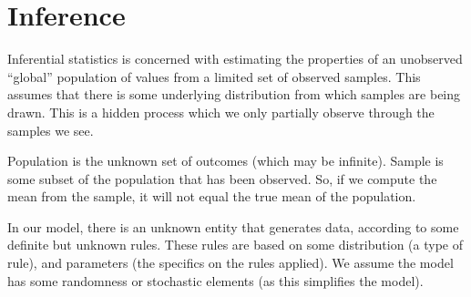 \documentclass[a4paper, openany]{memoir}
\begin{document}
\newpage

\section{Inference}
Inferential statistics is concerned with estimating the properties of an unobserved ``global'' population of values from a limited set of observed samples. This assumes that there is some underlying distribution from which samples are being drawn. This is a hidden process which we only partially observe through the samples we see.

Population is the unknown set of outcomes (which may be infinite). Sample is some subset of the population that has been observed. So, if we compute the mean from the sample, it will not equal the true mean of the population.

In our model, there is an unknown entity that generates data, according to some definite but unknown rules. These rules are based on some distribution (a type of rule), and parameters (the specifics on the rules applied). We assume the model has some randomness or stochastic elements (as this simplifies the model).
\end{document}
